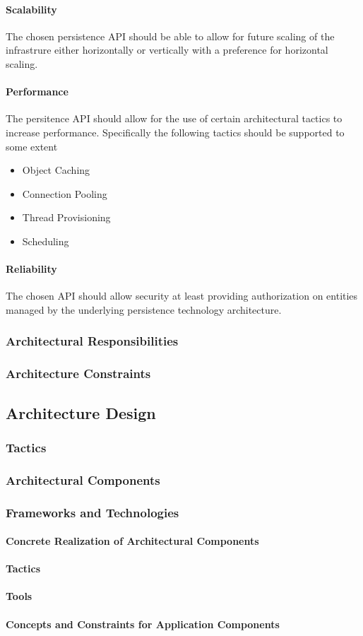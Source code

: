 \paragraph{Scalability}
The chosen persistence API should be able to allow for future scaling of the
infrastrure either horizontally or vertically with a preference for 
horizontal scaling.

\paragraph{Performance}
The persitence API should allow for the use of certain architectural tactics
to increase performance. Specifically the following tactics should be supported
to some extent
\begin{itemize}
	\item Object Caching
	\item Connection Pooling
	\item Thread Provisioning
	\item Scheduling
\end{itemize}

\paragraph{Reliability}
The chosen API should allow security at least providing authorization on
entities managed by the underlying persistence technology architecture.

\subsubsection{Architectural Responsibilities}
\subsubsection{Architecture Constraints}
\subsection{Architecture Design}
\subsubsection{Tactics}
\subsubsection{Architectural Components}
\subsubsection{Frameworks and Technologies}
\paragraph{Concrete Realization of Architectural Components}
\paragraph{Tactics}
\paragraph{Tools}
\paragraph{Concepts and Constraints for Application Components}